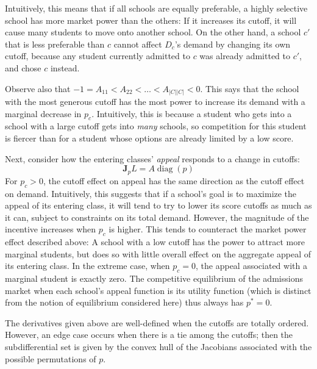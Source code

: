 \documentclass[12pt]{article}
\theoremstyle{definition}
\begin{document}
Intuitively, this means that if all schools are equally preferable, a highly selective school has more market power than the others: If it increases its cutoff, it will cause many students to move onto another school. On the other hand, a school $c'$ that is less preferable than $c$ cannot affect $D_c$'s demand by changing its own cutoff, because any student currently admitted to $c$ was already admitted to $c'$, and chose $c$ instead. 

Observe also that $-1 = A_{11} < A_{22} < \dots < A_{|C||C|} < 0$. This says that the school with the most generous cutoff has the most power to increase its demand with a marginal decrease in $p_c$. Intuitively, this is because a student who gets into a school with a large cutoff gets into \emph{many} schools, so competition for this student is fiercer than for a student whose options are already limited by a low score. 

Next, consider how the entering classes' \emph{appeal} responds to a change in cutoffs:
\[\mathbf{J}_p L = A\operatorname{diag}(p)\]
For $p_c > 0$, the cutoff effect on appeal has the same direction as the cutoff effect on demand. Intuitively, this suggests that if a school's goal is to maximize the appeal of its entering class, it will tend to try to lower its score cutoffs as much as it can, subject to constraints on its total demand. However, the magnitude of the incentive increases when $p_c$ is higher. This tends to counteract the market power effect described above: A school with a low cutoff has the power to attract more marginal students, but does so with little overall effect on the aggregate appeal of its entering class. In the extreme case, when $p_c = 0$, the appeal associated with a marginal student is exactly zero. The competitive equilibrium of the admissions market when each school's appeal function is its utility function (which is distinct from the notion of equilibrium considered here) thus always has $p^* = 0$. 

The derivatives given above are well-defined when the cutoffs are totally ordered. However, an edge case occurs when there is a tie among the cutoffs; then the subdifferential set is given by the convex hull of the Jacobians associated with the possible permutations of $p$. %
\end{document}
